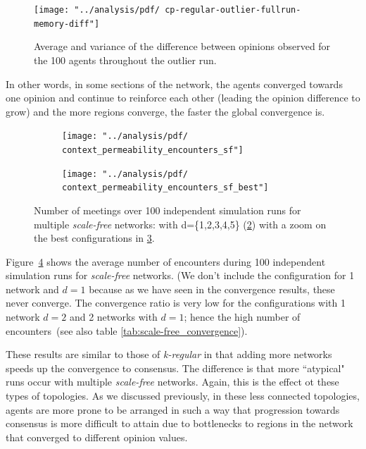 \documentclass[preprint,number]{elsarticle}
\begin{document}
\begin{figure}[H]
	\centering
	\texttt{[image: "../analysis/pdf/ cp-regular-outlier-fullrun-memory-diff"]}
	\begin{minipage}{0.9\textwidth}
		\caption{Average and variance of the difference between opinions observed for the 100 agents throughout the outlier run.}
		\label{fig:ctx_perm_kreg_run_outlier_diff_full}
	\end{minipage}
\end{figure}

\noindent In other words, in some sections of the network, the agents converged towards one opinion and continue to reinforce each other (leading the opinion difference to grow) and the more regions converge, the faster the global convergence is.  

\begin{figure}[H]
	\centering
	\begin{subfigure}{.49\linewidth}
		\centering
		\texttt{[image: "../analysis/pdf/ context\_permeability\_encounters\_sf"]}
		\caption{}
		\label{fig:ctx_perm_sf_full}
	\end{subfigure}%
	\begin{subfigure}{.49\linewidth}
		\centering
		\texttt{[image: "../analysis/pdf/   context\_permeability\_encounters\_sf\_best"]}
		\caption{}
		\label{fig:ctx_perm_sf_best}
	\end{subfigure}
	\begin{minipage}{0.9\linewidth}
		\vspace{0.2cm}
		\caption{Number of meetings over 100 independent simulation runs for multiple \textit{scale-free} networks: with d=\{1,2,3,4,5\} (\ref{fig:ctx_perm_sf_full}) with a zoom on the best configurations in \ref{fig:ctx_perm_sf_best}.}
		\label{fig:ctx_perm_sf}
	\end{minipage}
\end{figure}


\noindent Figure~\ref{fig:ctx_perm_sf} shows the average number of encounters during 100 independent simulation runs for \textit{scale-free} networks. (We don't include the configuration for 1 network and $d = 1$ because as we have seen in the convergence results, these never converge. The convergence ratio is very low for the configurations with 1 network $d = 2$ and 2 networks with $d = 1$; hence the high number of encounters~(see also table \ref{tab:scale-free_convergence}).

These results are similar to those of \textit{k-regular} in that adding more networks speeds up the convergence to consensus. The difference is that more ``atypical" runs occur with multiple \textit{scale-free} networks. Again, this is the effect ot these types of topologies. As we discussed previously, in these less connected topologies, agents are more prone to be arranged in such a way that progression towards consensus is more difficult to attain due to bottlenecks to regions in the network that converged to different opinion values. 
\end{document}
